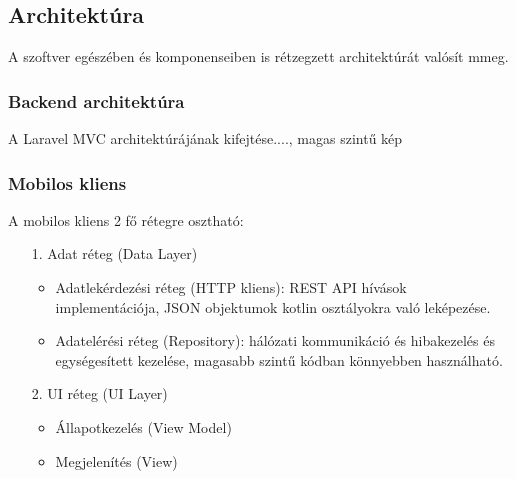 \subsection{Architektúra}

A szoftver egészében és komponenseiben is rétzegzett architektúrát valósít mmeg.

\subsubsection{Backend architektúra}

A Laravel MVC architektúrájának kifejtése...., magas szintű kép


\subsubsection{Mobilos kliens}

A mobilos kliens 2 fő rétegre osztható:

\begin{itemize}
    \item  [1.] Adat réteg (Data Layer)
    \begin{itemize}
        \item Adatlekérdezési réteg (HTTP kliens): REST API hívások implementációja, JSON objektumok kotlin osztályokra való leképezése.
        \item Adatelérési réteg (Repository): hálózati kommunikáció és hibakezelés és egységesített kezelése, magasabb szintű kódban könnyebben használható.
    \end{itemize}
    \item  [2.] UI réteg (UI Layer)
    \begin{itemize}
        \item  Állapotkezelés (View Model)
        \item  Megjelenítés (View)

    \end{itemize}
\end{itemize}